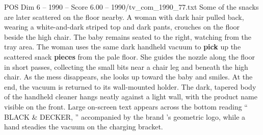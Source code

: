 \begin{textsample}{POS Dim 6 – 1990 – Score 6.00 – 1990/tv\_com\_1990\_77.txt}
Some of the snacks are later scattered on the floor nearby.
A woman with dark hair pulled back, wearing a white-and-dark striped top and dark pants, crouches on the floor beside the high chair.
The baby remains seated to the right, watching from the tray area.
The woman uses the same dark handheld vacuum to \textbf{pick} up the scattered snack \textbf{pieces} from the pale floor.
She guides the nozzle along the floor in short passes, collecting the small bits near a chair leg and beneath the high chair.
As the mess disappears, she looks up toward the baby and smiles.
At the end, the vacuum is returned to its wall-mounted holder.
The dark, tapered body of the handheld cleaner hangs neatly against a light wall, with the product name visible on the front.
Large on-screen text appears across the bottom reading “ BLACK \& DECKER, ” accompanied by the brand ’s geometric logo, while a hand steadies the vacuum on the charging bracket.

\end{textsample}

